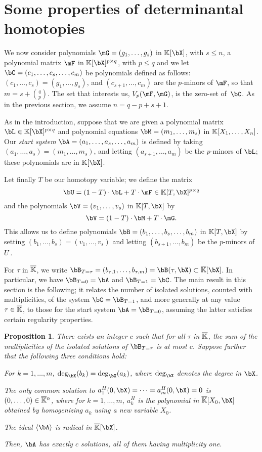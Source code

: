 \documentclass[12pt]{article}
\newtheorem{proposition}[definition]{Proposition}
\begin{document}
\section{Some properties of determinantal homotopies}\label{sec:homotopy}

We now consider polynomials $\mG=(g_1,\dots,g_s)$ in $\KK[\bX]$, with
$s \le n$, a polynomial matrix $\mF$ in $\KK[\bX]^{p \times q}$, with
$p \le q$ and we let $\bC=(c_1,\dots,c_{s},\dots,c_m)$ be polynomials
defined as follows: $(c_1,\dots,c_{s})=(g_1,\dots,g_s)$, and
$(c_{s+1},\dots,c_{m})$ are the $p$-minors of $\mF$, so that $m=s+{q
  \choose p}$. The set that interests us, $\VpFG{p}{\mF}{\mG}$, is the
zero-set of~$\bC$. As in the previous section, we assume $n=q-p+s+1$.

As in the introduction, suppose that we are given a polynomial matrix
$\bL \in \K[\bX]^{p \times q}$ and polynomial equations
$\bM=(m_1,\dots,m_s)$ in $\mathbb{K}[X_1,\dots,X_n]$. Our {\em start system}
$\bA=(a_1,\dots,a_s,\dots,a_m)$ is defined by taking $(a_1,\dots,a_s) =
(m_1,\dots,m_s)$, and letting $(a_{s+1},\dots,a_m)$ be the $p$-minors
of $\bL$; these polynomials are in $\KK[\bX]$. 

Let finally $T$ be our homotopy variable; we define the matrix
\[\bU = (1-T)\cdot \bL + T \cdot \mF \in \KK[T, \bX]^{p \times q}\]
and the polynomials $\bV=(v_1,\dots,v_s)$ in $\K[T,\bX]$ by
\[\bV = (1-T) \cdot \bM + T \cdot \mG.\]
This allows us to define polynomials $\bB=(b_1,\dots,b_s,\dots,b_m)$
in $\KK[T,\bX]$ by setting $(b_1,\dots,b_s)=(v_1,\dots,v_s)$
and letting $(b_{s+1},\dots,b_m)$ be the $p$-minors of ${U}$.

For $\tau$ in $\overline{\mathbb{K}}$, we write
$\bB_{T=\tau}=(b_{\tau,1},\dots,b_{\tau,m})=\bB(\tau,\bX)\subset
\KKbar[\bX]$. In particular, we have $\bB_{T=0}=\bA$ and
$\bB_{T=1}=\bC$.  The main result in this section is the following; it
relates the number of isolated solutions, counted with multiplicities,
of the system $\bC=\bB_{T=1}$, and more generally at any value $\tau
\in \overline{\mathbb{K}}$, to those for the start system $\bA=\bB_{T=0}$, assuming the latter
satisfies certain regularity properties.
\begin{proposition}\label{prop:degree_fiber}
  There exists an integer $c$ such that for all $\tau$ in $\overline{\mathbb{K}}$, the
  sum of the multiplicities of the isolated solutions of $\bB_{T=\tau}$
  is at most $c$. Suppose further that the following three conditions
  hold:
\begin{description}[leftmargin=*]
\item[$\assG_1.$] For $k=1,\dots,m$, $\deg_\bX(b_k)=\deg_\bX(a_k)$,
  where $\deg_\bX$ denotes the degree in $\bX$.
\item[$\assG_2.$] The only common solution to
  $a_1^H(0,\bX)=\cdots=a_m^H(0,\bX)=0$ is $(0,\dots,0)\in\overline{\mathbb{K}}{}^n$,
  where for $k=1,\dots,m$, $a_{k}^H$ is the polynomial in
  $\KKbar[X_0,\bX]$ obtained by homogenizing $a_{k}$ using a new
  variable $X_0$.
\item[$\assG_3.$] The ideal $\langle \bA \rangle$ is radical in $\KKbar[\bX]$.
\end{description}
Then, $\bA$ has exactly $c$ solutions, all of them having multiplicity
one.
\end{proposition}
\end{document}
